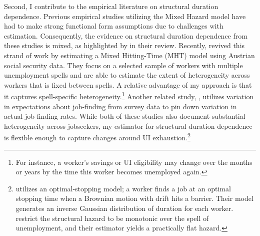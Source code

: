 \documentclass{div}
\begin{document}
Second, I contribute to the empirical literature on structural duration dependence. Previous empirical studies utilizing the Mixed Hazard model have had to make strong functional form assumptions due to challenges with estimation. Consequently, the evidence on structural duration dependence from these studies is mixed, as highlighted by \cite{MachinManning1999} in their review. Recently, \cite{AlvarezEtAl2016} revived this strand of work by estimating a Mixed Hitting-Time (MHT) model \citep{Abbring2012} using Austrian social security data. They focus on a selected sample of workers with multiple unemployment spells and are able to estimate the extent of heterogeneity across workers that is fixed between spells. A relative advantage of my approach is that it captures spell-specific heterogeneity.\footnote{For instance, a worker's savings or UI eligibility may change over the months or years by the time this worker becomes unemployed again.} Another related study, \cite{MuellerEtAl2021}, utilizes variation in expectations about job-finding from survey data to pin down variation in actual job-finding rates. While both of these studies also document substantial heterogeneity across jobseekers, my estimator for structural duration dependence is flexible enough to capture changes around UI exhaustion.\footnote{\cite{AlvarezEtAl2016} utilizes an optimal-stopping model; a worker finds a job at an optimal stopping time when a Brownian motion with drift hits a barrier. Their model generates an inverse Gaussian distribution of duration for each worker. \cite{MuellerEtAl2021} restrict the structural hazard to be monotonic over the spell of unemployment, and their estimator yields a practically flat hazard.}
\end{document}
